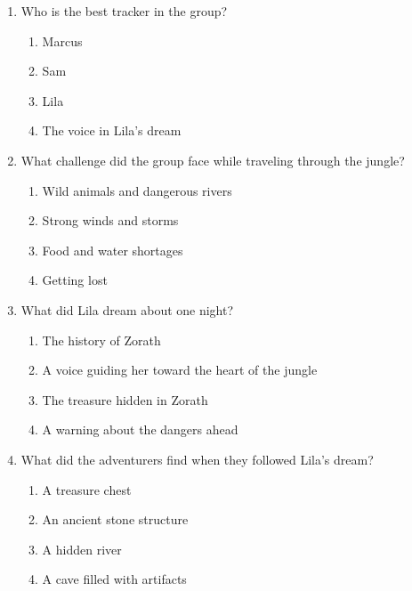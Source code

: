\documentclass[12pt]{article}
\begin{document}
\begin{enumerate}
\vspace{0.5cm}

\item Who is the best tracker in the group?
\begin{enumerate}[label=\Alph*.]
    \item Marcus
    \item Sam
    \item Lila
    \item The voice in Lila’s dream
\end{enumerate}

\vspace{0.5cm}

\item What challenge did the group face while traveling through the jungle?
\begin{enumerate}[label=\Alph*.]
    \item Wild animals and dangerous rivers
    \item Strong winds and storms
    \item Food and water shortages
    \item Getting lost
\end{enumerate}

\vspace{0.5cm}

\item What did Lila dream about one night?
\begin{enumerate}[label=\Alph*.]
    \item The history of Zorath
    \item A voice guiding her toward the heart of the jungle
    \item The treasure hidden in Zorath
    \item A warning about the dangers ahead
\end{enumerate}

\vspace{0.5cm}

\item What did the adventurers find when they followed Lila’s dream?
\begin{enumerate}[label=\Alph*.]
    \item A treasure chest
    \item An ancient stone structure
    \item A hidden river
    \item A cave filled with artifacts
\end{enumerate}


\end{enumerate}
\end{document}

